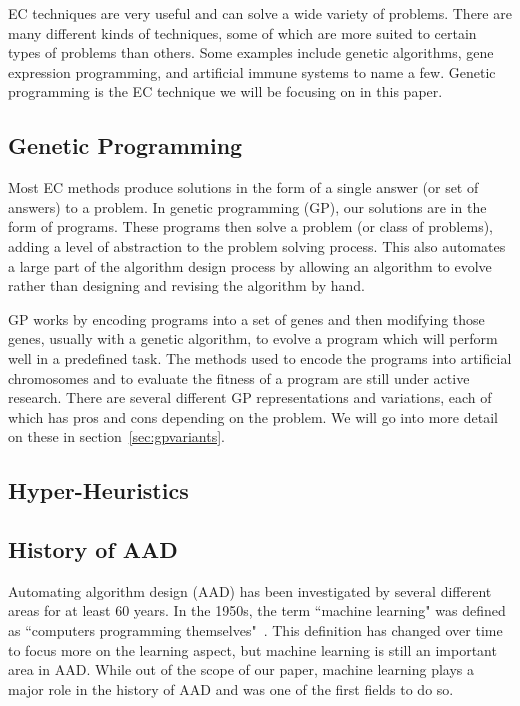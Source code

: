 \documentclass{sig-alternate}
\begin{document}
EC techniques are very useful and can solve a wide variety of problems. There are many different kinds of techniques, some of which are more suited to certain types of problems than others. Some examples include genetic algorithms, gene expression programming, and artificial immune systems to name a few. Genetic programming is the EC technique we will be focusing on in this paper.

\subsection{Genetic Programming}
\label{sec:GP}
Most EC methods produce solutions in the form of a single answer (or set of answers) to a problem. In genetic programming (GP), our solutions are in the form of programs. These programs then solve a problem (or class of problems), adding a level of abstraction to the problem solving process. 
This also automates a large part of the algorithm design process by allowing an algorithm to evolve rather than designing and revising the algorithm by hand. 

GP works by encoding programs into a set of genes and then modifying those genes, usually with a genetic algorithm, to evolve a program which will perform well in a predefined task. The methods used to encode the programs into artificial chromosomes and to evaluate the fitness of a program are still under active research. There are several different GP representations and variations, each of which has pros and cons depending on the problem. We will go into more detail on these in section~\ref{sec:gpvariants}.

\subsection{Hyper-Heuristics}
\label{sec:HH}

\subsection{History of AAD}
\label{sec:history}
Automating algorithm design (AAD) has been investigated by several different areas for at least 60 years. In the 1950s, the term ``machine learning" was defined as ``computers programming themselves"~\cite{pappa:2014}. This definition has changed over time to focus more on the learning aspect, but machine learning is still an important area in AAD. While out of the scope of our paper, machine learning plays a major role in the history of AAD and was one of the first fields to do so.
\end{document}

